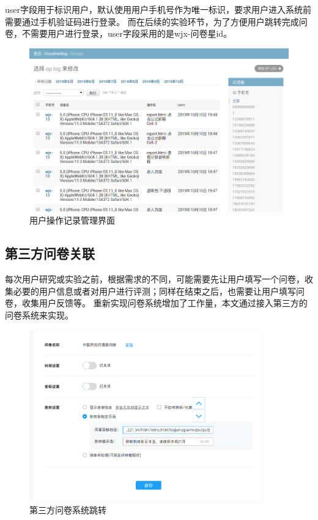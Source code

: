 user字段用于标识用户，默认使用用户手机号作为唯一标识，要求用户进入系统前需要通过手机验证码进行登录。
而在后续的实验环节，为了方便用户跳转完成问卷，不需要用户进行登录，user字段采用的是wjx-问卷星id。

\begin{figure}[h]
    \centering
    \includegraphics[width=12cm]{images/op_log.png}
    \caption{用户操作记录管理界面}
    \label{fig:op_log}
\end{figure}

\subsection{第三方问卷关联}
每次用户研究或实验之前，根据需求的不同，可能需要先让用户填写一个问卷，收集必要的用户信息或者对用户进行评测；同样在结束之后，也需要让用户填写问卷，收集用户反馈等。
重新实现问卷系统增加了工作量，本文通过接入第三方的问卷系统来实现。


\begin{figure}[h]
    \centering
    \includegraphics[width=10cm]{images/wjx1.png}
    \caption{第三方问卷系统跳转}
    \label{fig:wjx-ssojump}
\end{figure}

